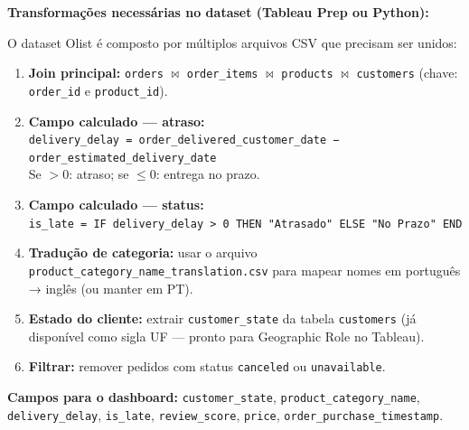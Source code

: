 \begin{SolvedBox}
\textbf{Transformações necessárias no dataset (Tableau Prep ou Python):}

O dataset Olist é composto por múltiplos arquivos CSV que precisam ser unidos:
\begin{enumerate}
  \item \textbf{Join principal:} \texttt{orders} $\bowtie$ \texttt{order\_items}
  $\bowtie$ \texttt{products} $\bowtie$ \texttt{customers}
  (chave: \texttt{order\_id} e \texttt{product\_id}).
  \item \textbf{Campo calculado — atraso:}\\
  \texttt{delivery\_delay = order\_delivered\_customer\_date − order\_estimated\_delivery\_date}\\
  Se $> 0$: atraso; se $\leq 0$: entrega no prazo.
  \item \textbf{Campo calculado — status:}\\
  \texttt{is\_late = IF delivery\_delay > 0 THEN "Atrasado" ELSE "No Prazo" END}
  \item \textbf{Tradução de categoria:} usar o arquivo \texttt{product\_category\_name\_translation.csv}
  para mapear nomes em português → inglês (ou manter em PT).
  \item \textbf{Estado do cliente:} extrair \texttt{customer\_state} da tabela \texttt{customers}
  (já disponível como sigla UF — pronto para Geographic Role no Tableau).
  \item \textbf{Filtrar:} remover pedidos com status \texttt{canceled} ou \texttt{unavailable}.
\end{enumerate}

\textbf{Campos para o dashboard:}
\texttt{customer\_state}, \texttt{product\_category\_name}, \texttt{delivery\_delay},
\texttt{is\_late}, \texttt{review\_score}, \texttt{price}, \texttt{order\_purchase\_timestamp}.
\end{SolvedBox}

